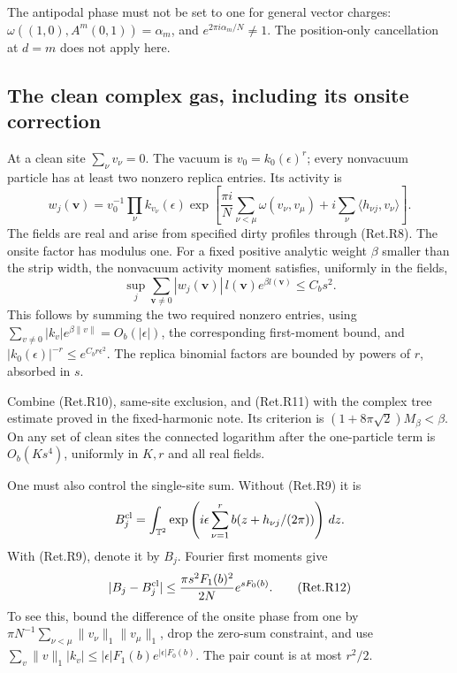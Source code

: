 The antipodal phase must not be set to one for general vector charges:
\(\omega((1,0),A^m(0,1))=\alpha_m\), and
\(e^{2\pi i\alpha_m/N}\ne1\). The position-only cancellation at \(d=m\)
does not apply here.

\hypertarget{the-clean-complex-gas-including-its-onsite-correction}{%
\subsection{The clean complex gas, including its onsite correction}\label{the-clean-complex-gas-including-its-onsite-correction}}

At a clean site \(\sum_\nu v_\nu=0\). The vacuum is
\(v_0=k_0(\epsilon)^r\); every nonvacuum particle has at least two nonzero
replica entries. Its activity is
\[
 w_j(\boldsymbol v)=v_0^{-1}\prod_\nu k_{v_\nu}(\epsilon)
   \exp\left[\frac{\pi i}{N}\sum_{\nu<\mu}\omega(v_\nu,v_\mu)
                         +i\sum_\nu\langle h_{\nu j},v_\nu\rangle\right].
\]
The fields are real and arise from specified dirty profiles through (Ret.R8).
The onsite factor has modulus one.
For a fixed positive analytic weight \(\beta\) smaller than the strip
width, the nonvacuum activity moment satisfies, uniformly in the fields,
\[
 \sup_j\sum_{\boldsymbol v\ne0}
           |w_j(\boldsymbol v)|\,l(\boldsymbol v)e^{\beta l(\boldsymbol v)}
                                                    \le C_bs^2. \tag{Ret.R11}
\]
This follows by summing the two required nonzero entries, using
\(\sum_{v\ne0}|k_v|e^{\beta\|v\|}=O_b(|\epsilon|)\),
the corresponding first-moment bound, and
\(|k_0(\epsilon)|^{-r}\le e^{C_br\epsilon^2}\).
The replica binomial factors are bounded by powers of \(r\), absorbed in \(s\).

Combine (Ret.R10), same-site exclusion, and (Ret.R11) with the complex tree
estimate proved in the fixed-harmonic note. Its criterion is
\((1+8\pi\sqrt2)M_\beta<\beta\).
On any set of clean sites the connected logarithm after the one-particle
term is \(O_b(Ks^4)\), uniformly in \(K,r\) and all real fields.

One must also control the single-site sum. Without (Ret.R9) it is
\[
 B^{\rm cl}_j=\int_{\mathbb T^2}
       \exp\left(i\epsilon\sum_{\nu=1}^r
                       b(z+h_{\nu j}/(2\pi))\right)\,dz .
\]
With (Ret.R9), denote it by \(B_j\). Fourier first moments give
\[
 |B_j-B^{\rm cl}_j|
       \le\frac{\pi s^2F_1(b)^2}{2N}e^{sF_0(b)}.           \tag{Ret.R12}
\]
To see this, bound the difference of the onsite phase from one by
\(\pi N^{-1}\sum_{\nu<\mu}\|v_\nu\|_1\|v_\mu\|_1\),
drop the zero-sum constraint, and use
\(\sum_v\|v\|_1|k_v|\le|\epsilon|F_1(b)e^{|\epsilon|F_0(b)}\).
The pair count is at most \(r^2/2\).

